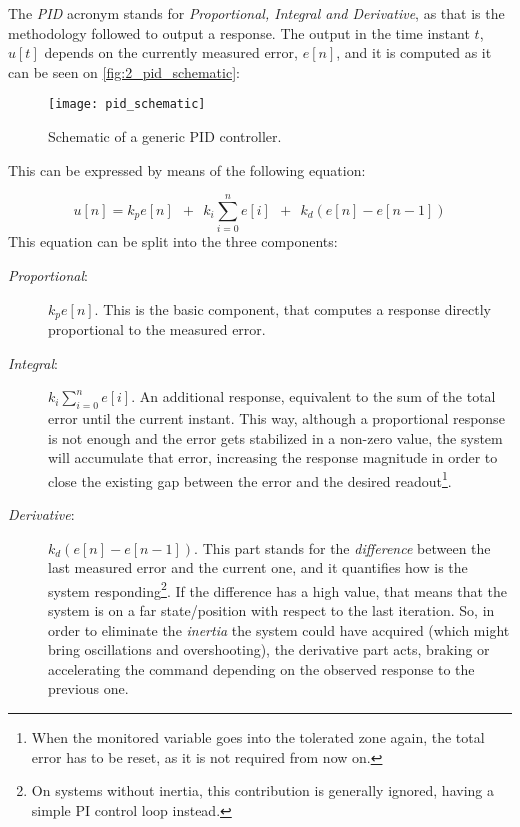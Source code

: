 The \textit{PID} acronym stands for \textit{Proportional, Integral and Derivative}, as that is the methodology followed to output a response. The output in the time instant $t$, $u[t]$ depends on the currently measured error, $e[n]$, and it is computed as it can be seen on \autoref{fig:2_pid_schematic}: 

\begin{figure}
	\centering
	\texttt{[image: pid\_schematic]}
	\caption{Schematic of a generic PID controller.}
	\label{fig:2_pid_schematic}
\end{figure}

This can be expressed by means of the following equation:

\begin{equation}
u[n] = k_p e[n] \ \ + \ \ k_i \sum_{i=0}^{n}e[i] \ \ + \ \ k_d (e[n] - e[n-1])
\label{eq:6_pid}
\end{equation}
This equation can be split into the three components:
\begin{description}
	\item[\textit{Proportional}:] $k_p e[n]$. This is the basic component, that computes a response directly proportional to the measured error.
	\item[\textit{Integral}:] $k_i \sum_{i=0}^{n}e[i]$. An additional response, equivalent to the sum of the total error until the current instant. This way, although a proportional response is not enough and the error gets stabilized in a non-zero value, the system will accumulate that error, increasing the response magnitude in order to close the existing gap between the error and the desired readout\footnote{When the monitored variable goes into the tolerated zone again, the total error has to be reset, as it is not required from now on.}.
	\item[\textit{Derivative}:] $k_d (e[n] - e[n-1])$. This part stands for the \emph{difference} between the last measured error and the current one, and it quantifies how is the system responding\footnote{On systems without inertia, this contribution is generally ignored, having a simple PI control loop instead.}. If the difference has a high value, that means that the system is on a far state/position with respect to the last iteration. So, in order to eliminate the \emph{inertia} the system could have acquired (which might bring oscillations and overshooting), the derivative part acts, braking or accelerating the command depending on the observed response to the previous one.
\end{description}




